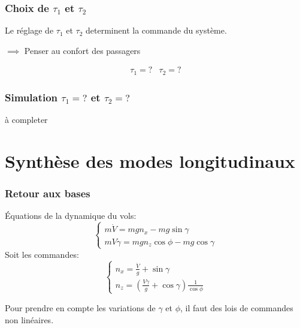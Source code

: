 \documentclass[footheight=2em]{beamer}
\begin{document}
\begin{frame}
    \frametitle{Choix de \( \tau_1 \) et \( \tau_2\)} \pause{}
    Le réglage de \( \tau_1 \) et \( \tau_2\) determinent la commande
    du système.\pause{}
    \begin{center}
        \( \implies \) Penser au confort des passagers
    \end{center}
    \pause{}
    \[
    \boxed{
    \begin{array}{ll}
        \tau_1 =  ? & \tau_2 = ?
    \end{array}
    }
    \]

\end{frame}

\begin{frame}
    \frametitle{Simulation \( \tau_1 = ? \) et \( \tau_2 = ? \)} \pause{}
    \begin{center}
        à completer
    \end{center}
\end{frame}

\section{Synthèse des modes longitudinaux}


\begin{frame}
    \frametitle{Retour aux bases} \pause{}
    Équations de la dynamique du vols:
    \[
    \left \{
    \begin{array}{l}
        m \dot{V} = mg n_x - mg \sin \gamma \\
        m V \dot{\gamma} = mg n_z \cos \phi - mg \cos \gamma
    \end{array}
    \right.
    \]\pause{}
    Soit les commandes:
    \[
    \left \{
    \begin{array}{l}
        n_x = \frac{\dot{V}}{g} + \sin \gamma \\
        n_z = \left(\frac{V \dot{\gamma}}{g} + \cos \gamma\right)
        \frac{1}{\cos \phi}
    \end{array}
    \right.
    \]\pause{}
    \begin{center}
        Pour prendre en compte les variations de \( \gamma \) et \( \phi \), il
        faut des lois de commandes non linéaires.
    \end{center}
\end{frame}
\end{document}

